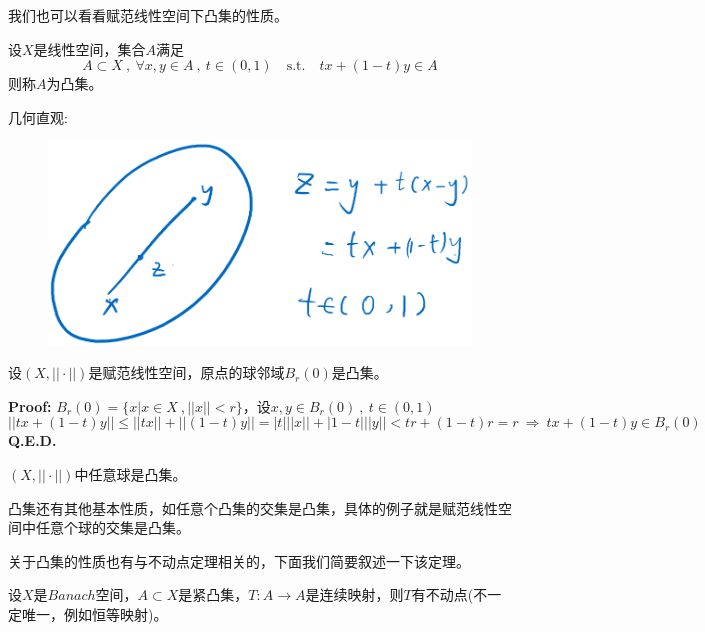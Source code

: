 我们也可以看看赋范线性空间下凸集的性质。
\begin{definition}[凸集]
    设$X$是线性空间，集合$A$满足
    \[A \subset X \ , \ \forall x,y \in A \ , \ t \in (0,1) \quad \text{s.t.} \quad tx+(1-t)y \in A\]
    则称$A$为凸集。
\end{definition}
几何直观:
\begin{figure}[htbp]
    \center
    \includegraphics[scale=0.22]{./fig/3.1.2.png}
\end{figure}
\begin{theorem}
    设$(X,||\cdot||)$是赋范线性空间，原点的球邻域$B_r(0)$是凸集。
\end{theorem}
\textbf{Proof:} $B_r(0)=\{x|x \in X \ ,||x||<r\}$，设$x,y \in B_r(0) \ , \ t \in (0,1)$
\[||tx+(1-t)y|| \leq ||tx||+||(1-t)y||=|t|||x||+|1-t|||y||<tr+(1-t)r=r \ \Rightarrow \ tx+(1-t)y \in B_r(0)\]
\textbf{Q.E.D.}
\begin{proposition}
    $(X,||\cdot||)$中任意球是凸集。
\end{proposition}
凸集还有其他基本性质，如任意个凸集的交集是凸集，具体的例子就是赋范线性空间中任意个球的交集是凸集。

关于凸集的性质也有与不动点定理相关的，下面我们简要叙述一下该定理。
\begin{theorem}
    设$X$是$Banach$空间，$A \subset X$是紧凸集，$T:A \to A$是连续映射，则$T$有不动点(不一定唯一，例如恒等映射)。
\end{theorem}
